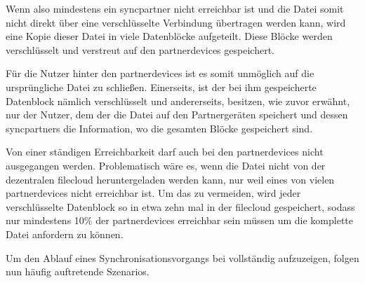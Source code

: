 Wenn also mindestens ein \gls{syncpartner} nicht erreichbar ist und die Datei somit
nicht direkt über eine verschlüsselte Verbindung übertragen werden kann, wird eine Kopie
dieser Datei in viele Datenblöcke aufgeteilt. Diese Blöcke werden verschlüsselt und
verstreut auf den \glspl{partnerdevice} gespeichert.

Für die Nutzer hinter den \glspl{partnerdevice} ist es somit unmöglich auf die ursprüngliche
Datei zu schließen. Einerseits, ist der bei ihm gespeicherte Datenblock nämlich
verschlüsselt und andererseits, besitzen, wie zuvor erwähnt, nur der Nutzer, dem
der die Datei auf den Partnergeräten speichert und dessen \glspl{syncpartner}
die Information, wo die gesamten Blöcke gespeichert sind. %

Von einer ständigen Erreichbarkeit darf auch bei den \glspl{partnerdevice} nicht
ausgegangen werden. Problematisch wäre es, wenn die Datei nicht von der dezentralen
\gls{filecloud} heruntergeladen werden kann, nur weil eines von vielen \glspl{partnerdevice}
nicht erreichbar ist. Um das zu vermeiden, wird jeder verschlüsselte Datenblock so in
etwa zehn mal in der \gls{filecloud} gespeichert, sodass nur mindestens 10\% der
\glspl{partnerdevice} erreichbar sein müssen um die komplette Datei anfordern zu können.

Um den Ablauf eines Synchronisationsvorgangs bei \sblit vollständig aufzuzeigen,
folgen nun häufig auftretende Szenarios.
